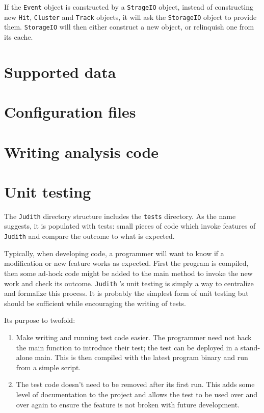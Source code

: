 \documentclass[10pt,a4paper]{book}
\newcommand{\Judith}{\Verb`Judith` }
\begin{document}
If the \Verb`Event` object is constructed by a \Verb`StrageIO` object, instead of constructing new \Verb`Hit`, \Verb`Cluster` and \Verb`Track` objects, it will ask the \Verb`StorageIO` object to provide them. \Verb`StorageIO` will then either construct a new object, or relinquish one from its cache.

\chapter{Supported data}

\chapter{Configuration files}

\chapter{Writing analysis code}

\chapter{Unit testing}
\label{ch:unittesting}

The \Judith directory structure includes the \Verb`tests` directory. As the name suggests, it is populated with tests: small pieces of code which invoke features of \Judith and compare the outcome to what is expected.

Typically, when developing code, a programmer will want to know if a modification or new feature works as expected. First the program is compiled, then some ad-hock code might be added to the main method to invoke the new work and check its outcome. \Judith's unit testing is simply a way to centralize and formalize this process. It is probably the simplest form of unit testing but should be sufficient while encouraging the writing of tests.

Its purpose to twofold:

\begin{enumerate}
	\item Make writing and running test code easier. The programmer need not hack the main function to introduce their test; the test can be deployed in a stand-alone main. This is then compiled with the latest program binary and run from a simple script.
	\item The test code doesn't need to be removed after its first run. This adds some level of documentation to the project and allows the test to be used over and over again to ensure the feature is not broken with future development.
\end{enumerate}
\end{document}
